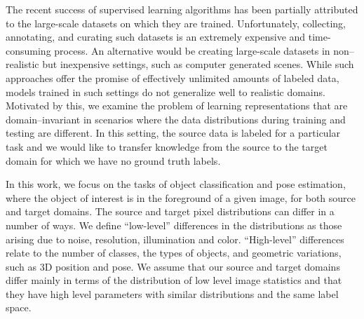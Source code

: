 \documentclass{article}
\begin{document}
The recent success of supervised learning algorithms has been partially
attributed to the large-scale datasets \cite{lin2014microsoft, ILSVRC15} 
on which they are trained. Unfortunately, collecting, annotating, and curating
such datasets is an extremely expensive and time-consuming process. An alternative
would be creating large-scale
datasets in non--realistic but inexpensive settings, such as
computer generated scenes. While such approaches offer the promise
of effectively unlimited amounts of labeled data, models trained in such
settings do not generalize well to realistic domains. 
Motivated by this, we examine the problem of learning
representations that are domain–invariant in scenarios where the data
distributions during training and testing are different. In this setting,
the source data is labeled for a particular task and we would like to
transfer knowledge from the source to the target domain for which we have no ground truth labels.





In this work, we focus on the tasks of object classification and pose estimation, where the object of
interest is in the foreground of a given image, for both source and target domains.
The source and target pixel distributions can differ in a number of ways. We
define ``low-level'' differences in the distributions as those arising due to noise,
resolution, illumination and color. ``High-level'' differences relate
to the number of classes, the types of objects, and geometric variations, such as
3D position and pose. We assume that our source and target domains differ mainly in terms of the
distribution of low level image statistics and that they have high level parameters with similar distributions and the same label space. 
\end{document}

